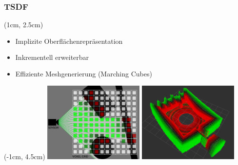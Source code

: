 \documentclass{beamer}
\begin{document}
\subsubsection*{TSDF}
\begin{frame}{\subsubsecname}
\begin{center}
\begin{textblock*}{10cm} (1cm, 2.5cm)
\begin{itemize}
\item Implizite Oberflächenrepräsentation
\item Inkrementell erweiterbar
\item Effiziente Meshgenerierung (Marching Cubes)
\end{itemize}    
\end{textblock*}
\begin{textblock*}{15cm}(-1cm, 4.5cm)
\includegraphics[width=5cm]{images/TSDF_Gen_new.png}
\includegraphics[width=5cm]{images/TSDF_3D_2.png}    
\end{textblock*}
\end{center}
\end{frame}
\end{document}
